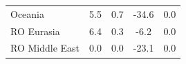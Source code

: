 \begin{tabular}{l c c cc}
Oceania & 5.5 & 0.7 & -34.6 & 0.0 \\RO Eurasia & 6.4 & 0.3 & -6.2 & 0.0 \\RO Middle East & 0.0 & 0.0 & -23.1 & 0.0 \\ \bottomrule
\end{tabular}
